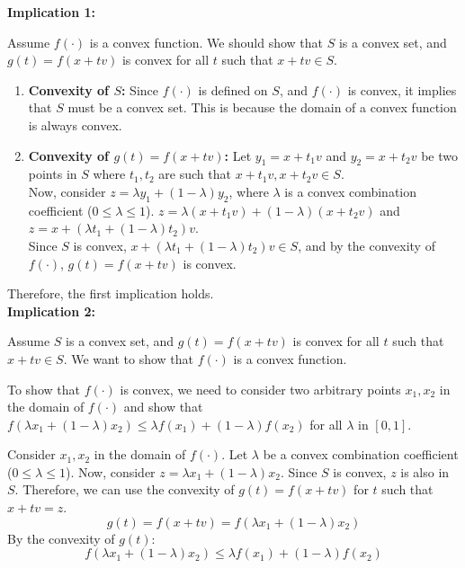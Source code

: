 \documentclass[12pt]{article}
\begin{document}
\textbf{Implication 1:}

Assume \( f(·) \) is a convex function. We should show that \( S \) is a convex set, and \( g(t) = f(x + tv) \) is convex for all \( t \) such that \( x + tv \in S \).

\begin{enumerate}
    \item \textbf{Convexity of \( S \):} Since \( f(·) \) is defined on \( S \), and \( f(·) \) is convex, it implies that \( S \) must be a convex set. This is because the domain of a convex function is always convex.
    
    \item \textbf{Convexity of \( g(t) = f(x + tv) \):} Let \( y_1 = x + t_1v \) and \( y_2 = x + t_2v \) be two points in \( S \) where \( t_1, t_2 \) are such that \( x + t_1v, x + t_2v \in S \). \\
    Now, consider \( z = \lambda y_1 + (1 - \lambda) y_2 \), where \( \lambda \) is a convex combination coefficient (\( 0 \leq \lambda \leq 1 \)). \( z = \lambda (x + t_1v) + (1 - \lambda)(x + t_2v) \) and \( z = x + (\lambda t_1 + (1 - \lambda)t_2)v \). \\
    Since \( S \) is convex, \( x + (\lambda t_1 + (1 - \lambda)t_2)v \in S \), and by the convexity of \( f(·) \), \( g(t) = f(x + tv) \) is convex.
\end{enumerate}

Therefore, the first implication holds. \\

\textbf{Implication 2:}

Assume \( S \) is a convex set, and \( g(t) = f(x + tv) \) is convex for all \( t \) such that \( x + tv \in S \). We want to show that \( f(·) \) is a convex function.

To show that \( f(·) \) is convex, we need to consider two arbitrary points \( x_1, x_2 \) in the domain of \( f(·) \) and show that \( f(\lambda x_1 + (1 - \lambda) x_2) \leq \lambda f(x_1) + (1 - \lambda) f(x_2) \) for all \( \lambda \) in \([0, 1]\).

Consider \( x_1, x_2 \) in the domain of \( f(·) \). Let \( \lambda \) be a convex combination coefficient (\( 0 \leq \lambda \leq 1 \)). Now, consider \( z = \lambda x_1 + (1 - \lambda) x_2 \). Since \( S \) is convex, \( z \) is also in \( S \). Therefore, we can use the convexity of \( g(t) = f(x + tv) \) for \( t \) such that \( x + tv = z \).
\[ g(t) = f(x + tv) = f(\lambda x_1 + (1 - \lambda) x_2) \]
By the convexity of \( g(t) \):
\[ f(\lambda x_1 + (1 - \lambda) x_2) \leq \lambda f(x_1) + (1 - \lambda) f(x_2) \]
\end{document}
